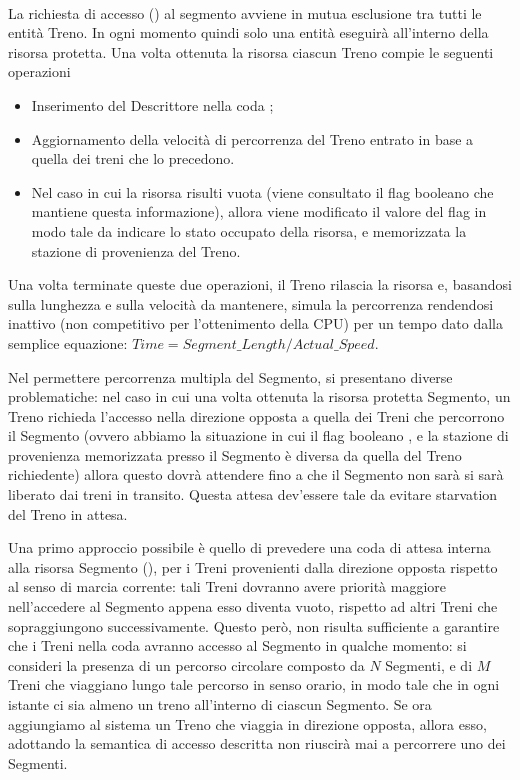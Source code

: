 		\begin{description}
			
			\item {} \\
			
			La richiesta di accesso () al segmento avviene in mutua esclusione tra tutti le entità Treno. In ogni momento quindi solo una entità eseguirà all'interno della risorsa protetta. Una volta ottenuta la risorsa ciascun Treno compie le seguenti operazioni
			 \begin{itemize}
			 	\item Inserimento del Descrittore nella coda ;
			 	\item Aggiornamento della velocità di percorrenza del Treno entrato in base a quella dei treni che lo precedono.
			 	\item Nel caso in cui la risorsa risulti vuota (viene consultato il flag booleano che mantiene questa informazione), allora viene modificato il valore del flag in modo tale da indicare lo stato occupato della risorsa, e memorizzata la stazione di provenienza del Treno.
			\end{itemize}
			Una volta terminate queste due operazioni, il Treno rilascia la risorsa e, basandosi sulla lunghezza e sulla velocità da mantenere, simula la percorrenza rendendosi inattivo (non competitivo per l'ottenimento della CPU) per un tempo dato dalla semplice equazione: $ Time = Segment\_Length / Actual\_Speed $.
			
			Nel permettere percorrenza multipla del Segmento, si presentano diverse problematiche: nel caso in cui una volta ottenuta la risorsa protetta Segmento, un Treno richieda l'accesso nella direzione opposta a quella dei Treni che percorrono il Segmento (ovvero abbiamo la situazione in cui il flag booleano , e la stazione di provenienza memorizzata presso il Segmento è diversa da quella del Treno richiedente) allora questo dovrà attendere fino a che il Segmento non sarà si sarà liberato dai treni in transito. Questa attesa dev'essere tale da evitare starvation del Treno in attesa.
			
			Una primo approccio possibile è quello di prevedere una coda di attesa interna alla risorsa Segmento (), per i Treni provenienti dalla direzione opposta rispetto al senso di marcia corrente: tali Treni dovranno avere priorità maggiore nell'accedere al Segmento appena esso diventa vuoto, rispetto ad altri Treni che sopraggiungono successivamente.
			Questo però, non risulta sufficiente a garantire che i Treni nella coda avranno accesso al Segmento in qualche momento: si consideri la presenza di un percorso circolare composto da $N$ Segmenti, e di $M$ Treni che viaggiano lungo tale percorso in senso orario, in modo tale che in ogni istante ci sia almeno un treno all'interno di ciascun Segmento. Se ora aggiungiamo al sistema un Treno che viaggia in direzione opposta, allora esso, adottando la semantica di accesso descritta non riuscirà mai a percorrere uno dei Segmenti.			
			

\end{description}
